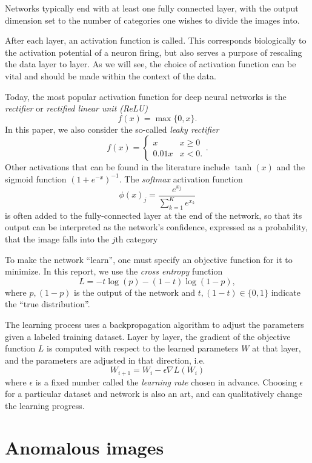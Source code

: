 \documentclass{article}
\begin{document}
  Networks typically end with at least one fully connected layer, with the output dimension set to the number of categories one wishes to divide the images into.

  After each layer, an activation function is called. This corresponds biologically to the activation potential of a neuron firing, but also serves a purpose of rescaling the data layer to layer. As we will see, the choice of activation function can be vital and should be made within the context of the data.

  Today, the most popular activation function for deep neural networks is the \emph{rectifier} or \emph{rectified linear unit (ReLU)}~\cite{lecun2015}
  \[ f(x) = \max \{0, x\}. \]
  In this paper, we also consider the so-called \emph{leaky rectifier}~\cite{leakyrectify}
  \[ f(x) = \begin{cases} x & x \geq 0 \\ 0.01 x & x < 0. \end{cases}. \]
  Other activations that can be found in the literature include $\tanh(x)$ and the sigmoid function ${(1+e^{-x})}^{-1}$.
  The \emph{softmax} activation function
  \[ {\phi(x)}_j=\frac{e^{x_j}}{\sum_{k=1}^K e^{x_k}} \]
  is often added to the fully-connected layer at the end of the network, so that its output can be interpreted as the network's confidence, expressed as a probability, that the image falls into the $j$th category

  To make the network ``learn'', one must specify an objective function for it to minimize. In this report, we use the \emph{cross entropy} function
  \[ L = - t \log(p) - (1-t) \log(1-p), \]
  where $p, (1-p)$ is the output of the network and $t, (1-t)\in \{0,1\}$ indicate the ``true distribution''.

  The learning process uses a backpropagation algorithm to adjust the parameters given a labeled training dataset. Layer by layer, the gradient of the objective function $L$ is computed with respect to the learned parameters $W$ at that layer, and the parameters are adjusted in that direction, i.e.
  \[ W_{i+1}=W_i-\epsilon\nabla L(W_i) \]
  where $\epsilon$ is a fixed number called the \emph{learning rate} chosen in advance. Choosing $\epsilon$ for a particular dataset and network is also an art, and can qualitatively change the learning progress.


\section{Anomalous images}
\end{document}
